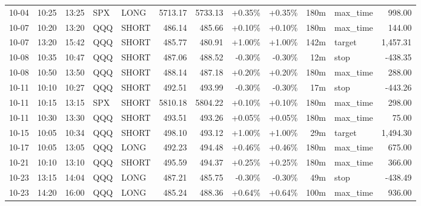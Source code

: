 \documentclass[11pt,a4paper]{article}
\begin{document}
\begin{center}
\begin{longtable}{>{\color{txtmain}}l l l l l r r r r r >{\color{txtmain}}l r}
10-04 & 10:25 & 13:25 & SPX & LONG & 5713.17 & 5733.13 & \textcolor{wingreen}{+0.35\%} & \textcolor{wingreen}{+0.35\%} & 180m & max\_time & \textcolor{wingreen}{998.00} \\
10-07 & 10:20 & 13:20 & QQQ & SHORT & 486.14 & 485.66 & \textcolor{wingreen}{+0.10\%} & \textcolor{wingreen}{+0.10\%} & 180m & max\_time & \textcolor{wingreen}{144.00} \\
10-07 & 13:20 & 15:42 & QQQ & SHORT & 485.77 & 480.91 & \textcolor{wingreen}{+1.00\%} & \textcolor{wingreen}{+1.00\%} & 142m & target & \textcolor{wingreen}{1,457.31} \\
10-08 & 10:35 & 10:47 & QQQ & SHORT & 487.06 & 488.52 & \textcolor{lossred}{-0.30\%} & \textcolor{lossred}{-0.30\%} & 12m & stop & \textcolor{lossred}{-438.35} \\
10-08 & 10:50 & 13:50 & QQQ & SHORT & 488.14 & 487.18 & \textcolor{wingreen}{+0.20\%} & \textcolor{wingreen}{+0.20\%} & 180m & max\_time & \textcolor{wingreen}{288.00} \\
10-11 & 10:10 & 10:27 & QQQ & SHORT & 492.51 & 493.99 & \textcolor{lossred}{-0.30\%} & \textcolor{lossred}{-0.30\%} & 17m & stop & \textcolor{lossred}{-443.26} \\
10-11 & 10:15 & 13:15 & SPX & SHORT & 5810.18 & 5804.22 & \textcolor{wingreen}{+0.10\%} & \textcolor{wingreen}{+0.10\%} & 180m & max\_time & \textcolor{wingreen}{298.00} \\
10-11 & 10:30 & 13:30 & QQQ & SHORT & 493.51 & 493.26 & \textcolor{wingreen}{+0.05\%} & \textcolor{wingreen}{+0.05\%} & 180m & max\_time & \textcolor{wingreen}{75.00} \\
10-15 & 10:05 & 10:34 & QQQ & SHORT & 498.10 & 493.12 & \textcolor{wingreen}{+1.00\%} & \textcolor{wingreen}{+1.00\%} & 29m & target & \textcolor{wingreen}{1,494.30} \\
10-17 & 10:05 & 13:05 & QQQ & LONG & 492.23 & 494.48 & \textcolor{wingreen}{+0.46\%} & \textcolor{wingreen}{+0.46\%} & 180m & max\_time & \textcolor{wingreen}{675.00} \\
10-21 & 10:10 & 13:10 & QQQ & SHORT & 495.59 & 494.37 & \textcolor{wingreen}{+0.25\%} & \textcolor{wingreen}{+0.25\%} & 180m & max\_time & \textcolor{wingreen}{366.00} \\
10-23 & 13:15 & 14:04 & QQQ & LONG & 487.21 & 485.75 & \textcolor{lossred}{-0.30\%} & \textcolor{lossred}{-0.30\%} & 49m & stop & \textcolor{lossred}{-438.49} \\
10-23 & 14:20 & 16:00 & QQQ & LONG & 485.24 & 488.36 & \textcolor{wingreen}{+0.64\%} & \textcolor{wingreen}{+0.64\%} & 100m & max\_time & \textcolor{wingreen}{936.00} \\

\end{longtable}
\end{center}
\end{document}
